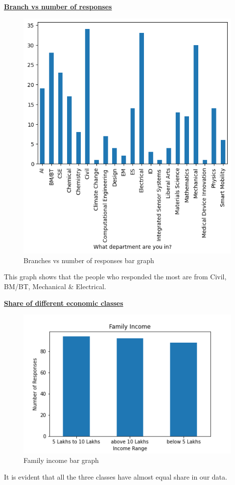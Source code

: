 \documentclass{article}
\begin{document}
\centerline{\underline{\bfseries{Branch vs number of responses}}}

\begin{figure}[H]
    \centering
    \includegraphics[scale = 0.6]{bar_department.png}
    \caption{Branches vs number of responses bar graph}  
    \label{fig:Normality_plot}
\end{figure}
This graph shows that the people who responded the most are from Civil, BM/BT, Mechanical \& Electrical.

\centerline{\underline{\bfseries{Share of different economic classes}}}

\begin{figure}[H]
    \centering
    \includegraphics[scale = 0.7]{bar_familyincome.png}
    \caption{Family income bar graph}  
    \label{fig:Normality_plot}
\end{figure}
It is evident that all the three classes have almost equal share in our data.\\
\end{document}
